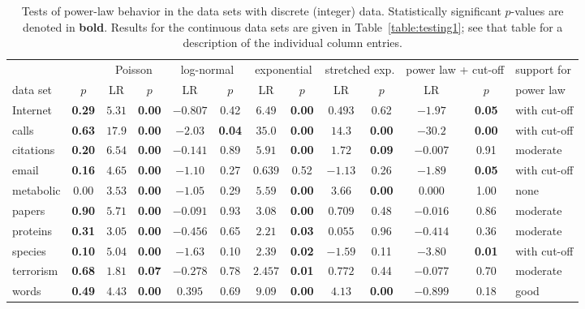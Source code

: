 \documentclass[final]{siamltex}
\newcommand{\tbf}{\textbf}
\begin{document}
\begin{table}
\setlength{\tabcolsep}{6pt}
\begin{center}
\begin{tabular}{l|c|cc|cc|cc|cc|cc|l}
& & \multicolumn{2}{c|}{Poisson} & \multicolumn{2}{c|}{log-normal} & \multicolumn{2}{c|}{exponential} & \multicolumn{2}{c|}{stretched exp.} & \multicolumn{2}{c|}{power law + cut-off} & support for\\
data set  & $p$ & LR & $p$ & LR & $p$ & LR & $p$ & LR & $p$ & LR & $p$ & power law\\
\hline
Internet  & \tbf{0.29} & $5.31$ & \tbf{0.00} & $-0.807$ &      0.42  & $6.49$  & \tbf{0.00} & $0.493$ &      0.62  & $-1.97$  & \tbf{0.05} & with cut-off \\ 
calls     & \tbf{0.63} & $17.9$ & \tbf{0.00} & $-2.03$  & \tbf{0.04} & $35.0$  & \tbf{0.00} & $14.3$  & \tbf{0.00} & $-30.2$  & \tbf{0.00} & with cut-off \\
citations & \tbf{0.20} & $6.54$ & \tbf{0.00} & $-0.141$ &      0.89  & $5.91$  & \tbf{0.00} & $1.72$  & \tbf{0.09} & $-0.007$ &      0.91  & moderate \\
email     & \tbf{0.16} & $4.65$ & \tbf{0.00} & $-1.10$  &      0.27  & $0.639$ &      0.52  & $-1.13$ &      0.26  & $-1.89$  & \tbf{0.05} & with cut-off \\
metabolic &      0.00  & $3.53$ & \tbf{0.00} & $-1.05$  &      0.29  & $5.59$  & \tbf{0.00} & $3.66$  & \tbf{0.00} & $0.000$  &      1.00  & none \\
papers    & \tbf{0.90} & $5.71$ & \tbf{0.00} & $-0.091$ &      0.93  & $3.08$  & \tbf{0.00} & $0.709$ &      0.48  & $-0.016$ &      0.86  & moderate \\ 
proteins  & \tbf{0.31} & $3.05$ & \tbf{0.00} & $-0.456$ &      0.65  & $2.21$  & \tbf{0.03} & $0.055$ &      0.96  & $-0.414$ &      0.36  & moderate \\
species   & \tbf{0.10} & $5.04$ & \tbf{0.00} & $-1.63$  &      0.10  & $2.39$  & \tbf{0.02} & $-1.59$ &      0.11  & $-3.80$  & \tbf{0.01} & with cut-off \\
terrorism & \tbf{0.68} & $1.81$ & \tbf{0.07} & $-0.278$ &      0.78  & $2.457$ & \tbf{0.01} & $0.772$ &      0.44  & $-0.077$ &      0.70  & moderate \\
words     & \tbf{0.49} & $4.43$ & \tbf{0.00} & $0.395$  &      0.69  & $9.09$  & \tbf{0.00} & $4.13$  & \tbf{0.00} & $-0.899$ &      0.18  & good
\end{tabular}
\end{center}
\caption{Tests of power-law behavior in the data sets with discrete
 (integer) data.  Statistically significant $p$-values are denoted in
 \textbf{bold}.  Results for the continuous data sets are given in
 Table~\ref{table:testing1}; see that table for a description of the
 individual column entries.}
\label{table:testing2}
\end{table}
\end{document}
